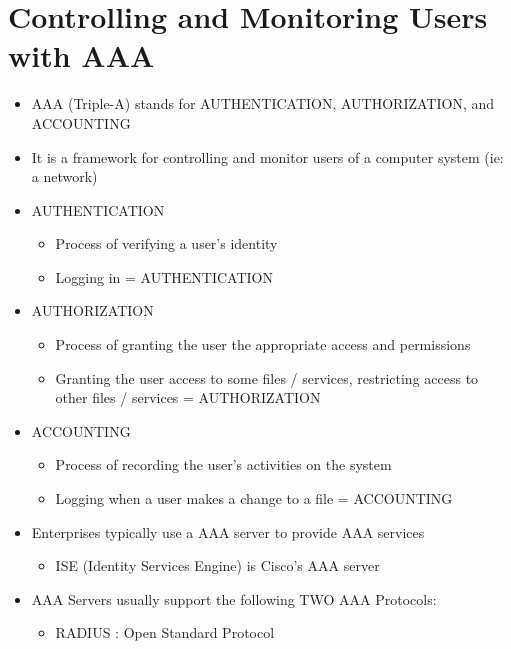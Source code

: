 \section{Controlling and Monitoring Users with
AAA}\label{controlling-and-monitoring-users-with-aaa}

\begin{itemize}
\item
  AAA (Triple-A) stands for AUTHENTICATION, AUTHORIZATION, and
  ACCOUNTING
\item
  It is a framework for controlling and monitor users of a computer
  system (ie: a network)
\item
  AUTHENTICATION

  \begin{itemize}
  \tightlist
  \item
    Process of verifying a user's identity
  \item
    Logging in = AUTHENTICATION
  \end{itemize}
\item
  AUTHORIZATION

  \begin{itemize}
  \tightlist
  \item
    Process of granting the user the appropriate access and permissions
  \item
    Granting the user access to some files / services, restricting
    access to other files / services = AUTHORIZATION
  \end{itemize}
\item
  ACCOUNTING

  \begin{itemize}
  \tightlist
  \item
    Process of recording the user's activities on the system
  \item
    Logging when a user makes a change to a file = ACCOUNTING
  \end{itemize}
\item
  Enterprises typically use a AAA server to provide AAA services

  \begin{itemize}
  \tightlist
  \item
    ISE (Identity Services Engine) is Cisco's AAA server
  \end{itemize}
\item
  AAA Servers usually support the following TWO AAA Protocols:

  \begin{itemize}
  \tightlist
  \item
    RADIUS : Open Standard Protocol


\end{itemize}
\end{itemize}
